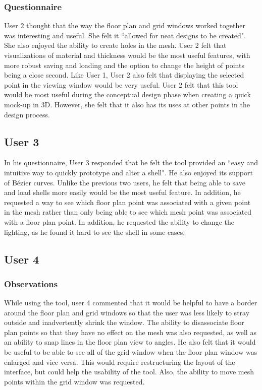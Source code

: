 \documentclass{thesis}
\begin{document}
\subsubsection{Questionnaire}
User 2 thought that the way the floor plan and grid windows worked together was interesting and useful.  She felt it ``allowed for neat
designs to be created".  She also enjoyed the ability to create holes in the mesh.  User 2 felt that visualizations of material and
thickness would be the most useful features, with more robust saving and loading and the option to change the height of points being
a close second.  Like User 1, User 2 also felt that displaying the selected point in the viewing window would be very useful.  User 2
felt that this tool would be most useful during the conceptual design phase when creating a quick mock-up in 3D.  However, she felt
that it also has its uses at other points in the design process.

\subsection{User 3}
In his questionnaire, User 3 responded that he felt the tool provided an ``easy and intuitive way to quickly prototype and alter a
shell".  He also enjoyed its support of B\'{e}zier curves.  Unlike the previous two users, he felt that being able to save and load
shells more easily would be the most useful feature.  In addition, he requested a way to see which floor plan point was associated with
a given point in the mesh rather than only being able to see which mesh point was associated with a floor plan point.  In addition, he
requested the ability to change the lighting, as he found it hard to see the shell in some cases.

\subsection{User 4}
\subsubsection{Observations}
While using the tool, user 4 commented that it would be helpful to have a border around the floor plan and grid windows so that the
user was less likely to stray outside and inadvertently shrink the window.  The ability to disassociate floor plan points so that they
have no effect on the mesh was also requested, as well as an ability to snap lines in the floor plan view to angles.  He also felt
that it would be useful to be able to see all of the grid window when the floor plan window was enlarged and vice versa.  This would
require restructuring the layout of the interface, but could help the usability of the tool.  Also, the ability to move mesh points
within the grid window was requested.
\end{document}
